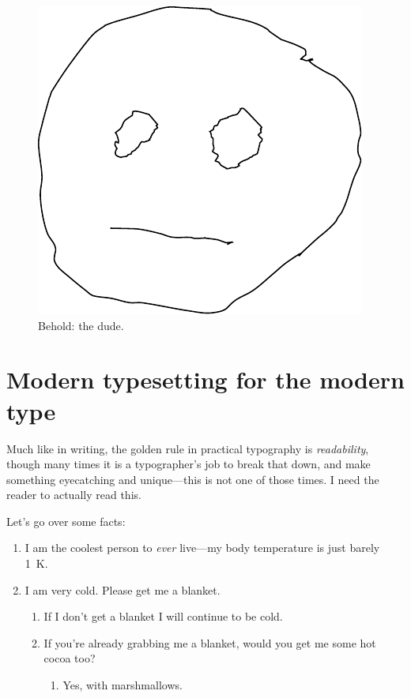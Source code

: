 \documentclass[%
	english,%
	 a4paper,%
	titlepage,%
	fleqn]{article}
\providecommand{\tightlist}{%
  \setlength{\itemsep}{0pt}\setlength{\parskip}{0pt}}
\begin{document}
\begin{figure}
\centering
\includegraphics{img/theDude.pdf}
\caption{Behold: the dude.}
\end{figure}

\section{Modern typesetting for the modern
type}\label{modern-typesetting-for-the-modern-type}

Much like in writing, the golden rule in practical typography is
\emph{readability}, though many times it is a typographer's job to break
that down, and make something eyecatching and unique---this is not one
of those times. I need the reader to actually read this.

Let's go over some facts:

\begin{enumerate}
\tightlist
\item
  I am the coolest person to \emph{ever} live---my body temperature is
  just barely \qty{1}{\kelvin}.
\item
  I am very cold. Please get me a blanket.

  \begin{enumerate}
  \tightlist
  \item
    If I don't get a blanket I will continue to be cold.
  \item
    If you're already grabbing me a blanket, would you get me some hot
    cocoa too?

    \begin{enumerate}
    \tightlist
    \item
      Yes, with marshmallows.
    \end{enumerate}
  \end{enumerate}
\end{enumerate}
\end{document}
